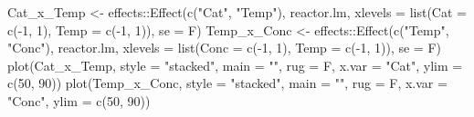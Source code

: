 \documentclass[
]{book}
\newenvironment{Shaded}{\begin{snugshade}}{\end{snugshade}}
\newcommand{\AttributeTok}[1]{\textcolor[rgb]{0.77,0.63,0.00}{#1}}
\newcommand{\DecValTok}[1]{\textcolor[rgb]{0.00,0.00,0.81}{#1}}
\newcommand{\FunctionTok}[1]{\textcolor[rgb]{0.00,0.00,0.00}{#1}}
\newcommand{\NormalTok}[1]{#1}
\newcommand{\OtherTok}[1]{\textcolor[rgb]{0.56,0.35,0.01}{#1}}
\newcommand{\SpecialCharTok}[1]{\textcolor[rgb]{0.00,0.00,0.00}{#1}}
\newcommand{\StringTok}[1]{\textcolor[rgb]{0.31,0.60,0.02}{#1}}
\theoremstyle{definition}
\theoremstyle{definition}
\theoremstyle{definition}
\theoremstyle{definition}
\theoremstyle{remark}
\begin{document}
\begin{Shaded}
\begin{Highlighting}[]
\NormalTok{Cat\_x\_Temp }\OtherTok{\textless{}{-}}\NormalTok{ effects}\SpecialCharTok{::}\FunctionTok{Effect}\NormalTok{(}\FunctionTok{c}\NormalTok{(}\StringTok{"Cat"}\NormalTok{, }\StringTok{"Temp"}\NormalTok{), reactor.lm, }
                              \AttributeTok{xlevels =} \FunctionTok{list}\NormalTok{(}\AttributeTok{Cat =} \FunctionTok{c}\NormalTok{(}\SpecialCharTok{{-}}\DecValTok{1}\NormalTok{, }\DecValTok{1}\NormalTok{), }\AttributeTok{Temp =} \FunctionTok{c}\NormalTok{(}\SpecialCharTok{{-}}\DecValTok{1}\NormalTok{, }\DecValTok{1}\NormalTok{)), }
                              \AttributeTok{se =}\NormalTok{ F)}
\NormalTok{Temp\_x\_Conc }\OtherTok{\textless{}{-}}\NormalTok{ effects}\SpecialCharTok{::}\FunctionTok{Effect}\NormalTok{(}\FunctionTok{c}\NormalTok{(}\StringTok{"Temp"}\NormalTok{, }\StringTok{"Conc"}\NormalTok{), reactor.lm, }
                               \AttributeTok{xlevels =} \FunctionTok{list}\NormalTok{(}\AttributeTok{Conc =} \FunctionTok{c}\NormalTok{(}\SpecialCharTok{{-}}\DecValTok{1}\NormalTok{, }\DecValTok{1}\NormalTok{), }\AttributeTok{Temp =} \FunctionTok{c}\NormalTok{(}\SpecialCharTok{{-}}\DecValTok{1}\NormalTok{, }\DecValTok{1}\NormalTok{)),}
                               \AttributeTok{se =}\NormalTok{ F)}
\FunctionTok{plot}\NormalTok{(Cat\_x\_Temp, }\AttributeTok{style =} \StringTok{"stacked"}\NormalTok{, }\AttributeTok{main =} \StringTok{""}\NormalTok{, }\AttributeTok{rug =}\NormalTok{ F, }\AttributeTok{x.var =} \StringTok{"Cat"}\NormalTok{, }
     \AttributeTok{ylim =} \FunctionTok{c}\NormalTok{(}\DecValTok{50}\NormalTok{, }\DecValTok{90}\NormalTok{))}
\FunctionTok{plot}\NormalTok{(Temp\_x\_Conc, }\AttributeTok{style =} \StringTok{"stacked"}\NormalTok{, }\AttributeTok{main =} \StringTok{""}\NormalTok{, }\AttributeTok{rug =}\NormalTok{ F, }\AttributeTok{x.var =} \StringTok{"Conc"}\NormalTok{, }
     \AttributeTok{ylim =} \FunctionTok{c}\NormalTok{(}\DecValTok{50}\NormalTok{, }\DecValTok{90}\NormalTok{))}
\end{Highlighting}
\end{Shaded}
\end{document}
